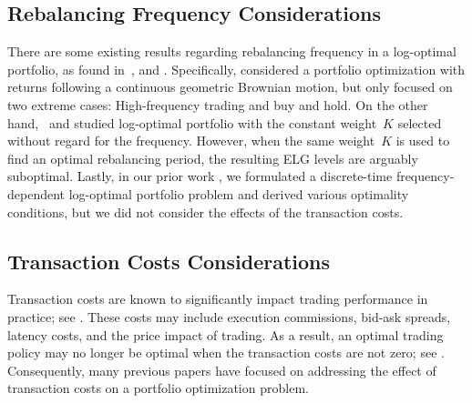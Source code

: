 \documentclass[10pt]{article} %
\begin{document}
	\subsection{Rebalancing Frequency Considerations}
	There are some existing results regarding rebalancing frequency in a log-optimal portfolio, as found in~\cite{kuhn2010analysis, das2014computing, das2015computing}, and \cite{hsieh2021necessary}. 
	Specifically, \cite{kuhn2010analysis} considered a portfolio optimization with returns following a continuous geometric Brownian motion, but only focused on two extreme cases: High-frequency trading and buy and hold.
	On the other hand,~\cite{das2014computing} and \cite{das2015computing} studied log-optimal portfolio with the constant weight~$K$ selected without regard for the frequency.
	However, when the same weight~$K$ is used to find an optimal rebalancing period, the resulting ELG levels are arguably suboptimal. 
	Lastly, in our prior work \cite{hsieh2021necessary}, we formulated a discrete-time frequency-dependent log-optimal portfolio problem and derived various optimality conditions, but we did not consider the effects of the transaction costs.
	
	
	
	\subsection{Transaction Costs Considerations}
	Transaction costs are known to significantly impact  trading performance in practice; see \cite{cornuejols2006optimization, bogle2017little}. 
	These costs may include execution commissions, bid-ask spreads, latency costs, and the price impact of trading.
	As a result, an optimal trading policy may no longer be optimal when the transaction costs are not zero; see \cite{cvitanic2004introduction, hsieh2018frequency}.
	Consequently, many previous papers have focused on addressing the effect of transaction costs on a portfolio optimization problem. 
	
\end{document}
